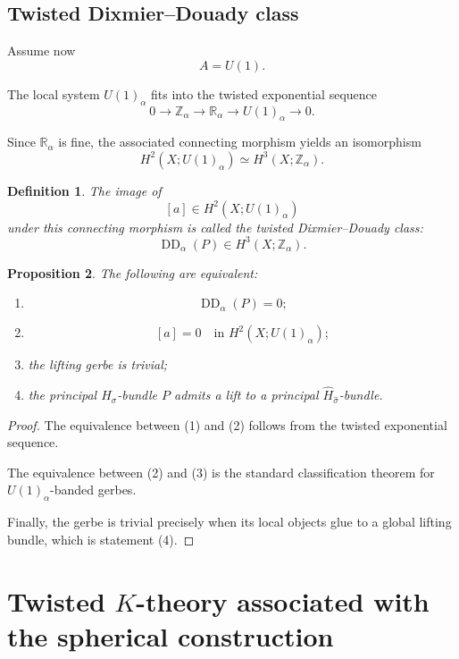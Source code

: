 \documentclass[11pt]{amsart}
\newtheorem{definition}{Definition}[section]
\newtheorem{proposition}[definition]{Proposition}
\begin{document}
\subsection{Twisted Dixmier--Douady class}

Assume now
\[
A=U(1).
\]

The local system \(U(1)_\alpha\) fits into the twisted exponential sequence
\[
0
\longrightarrow
\mathbb Z_\alpha
\longrightarrow
\mathbb R_\alpha
\longrightarrow
U(1)_\alpha
\longrightarrow 0.
\]

Since \(\mathbb R_\alpha\) is fine, the associated connecting morphism yields
an isomorphism
\[
H^2(X;U(1)_\alpha)
\simeq
H^3(X;\mathbb Z_\alpha).
\]

\begin{definition}
The image of
\[
[a]\in H^2(X;U(1)_\alpha)
\]
under this connecting morphism is called the \emph{twisted
Dixmier--Douady class}:
\[
\operatorname{DD}_\alpha(P)
\in
H^3(X;\mathbb Z_\alpha).
\]
\end{definition}

\begin{proposition}
The following are equivalent:
\begin{enumerate}
\item
\[
\operatorname{DD}_\alpha(P)=0;
\]

\item
\[
[a]=0
\quad\text{in }H^2(X;U(1)_\alpha);
\]

\item the lifting gerbe is trivial;

\item the principal \(H_\sigma\)-bundle \(P\) admits a lift to a principal
\(\widehat H_{\widehat\sigma}\)-bundle.
\end{enumerate}
\end{proposition}

\begin{proof}
The equivalence between (1) and (2) follows from the twisted exponential
sequence.

The equivalence between (2) and (3) is the standard classification theorem for
\(U(1)_\alpha\)-banded gerbes.

Finally, the gerbe is trivial precisely when its local objects glue to a
global lifting bundle, which is statement (4).
\end{proof}

\section{Twisted \(K\)-theory associated with the spherical construction}
\label{sec:twisted-k-theory}
\end{document}
